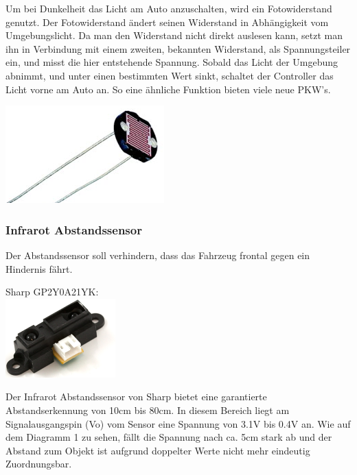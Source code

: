 \documentclass{scrartcl}
\begin{document}
			Um bei Dunkelheit das Licht am Auto anzuschalten, wird ein Fotowiderstand genutzt.
			Der Fotowiderstand ändert seinen Widerstand in Abhängigkeit vom Umgebungslicht.
			Da man den Widerstand nicht direkt auslesen kann, setzt man ihn in Verbindung mit einem zweiten,
			bekannten Widerstand, als Spannungsteiler ein, und misst die hier entstehende Spannung.
			Sobald das Licht der Umgebung abnimmt, und unter einen bestimmten Wert sinkt,
			schaltet der Controller das Licht vorne am Auto an.
			So eine ähnliche Funktion bieten viele neue PKW's.

			\includegraphics{images/helligkeitssensor.png}

		\subsubsection{Infrarot Abstandssensor}
			Der Abstandssensor soll verhindern, dass das Fahrzeug frontal gegen ein Hindernis fährt.

			Sharp GP2Y0A21YK:\\
			\includegraphics{images/infrarotsensor.png}

			Der Infrarot Abstandssensor von Sharp bietet eine garantierte Abstandserkennung von 10cm bis 80cm.
			In diesem Bereich liegt am Signalausgangspin (Vo) vom Sensor eine Spannung von 3.1V bis 0.4V an.
			Wie auf dem Diagramm 1 zu sehen, fällt die Spannung nach ca. 5cm stark ab
			und der Abstand zum Objekt ist aufgrund doppelter Werte nicht mehr eindeutig Zuordnungsbar. 
\end{document}

